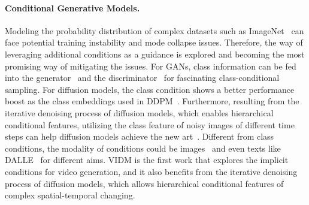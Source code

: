 \documentclass[letterpaper]{article}
\begin{document}
\paragraph{Conditional Generative Models.}
Modeling the probability distribution of complex datasets such as ImageNet~\cite{deng2009imagenet} can face potential training instability and mode collapse issues.
Therefore, the way of leveraging additional conditions as a guidance is explored and becoming the most promising way of mitigating the issues.
For GANs, class information can be fed into the generator~\cite{mirza2014conditional, odena2017conditional, de2017modulating, dumoulin2016learned, brock2018large} and the discriminator~\cite{miyato2018cgans,karras2019style} for fascinating class-conditional sampling.
For diffusion models, the class condition shows a better performance boost as the class embeddings used in DDPM~\cite{ho2020denoising}.
Furthermore, resulting from the iterative denoising process of diffusion models, which enables hierarchical conditional features, utilizing the class feature of noisy images of different time steps can help diffusion models achieve the new art~\cite{dhariwal2021diffusion}.
Different from class conditions, the modality of conditions could be images~\cite{ledig2017photo, nair2022ddpm} and even texts like DALLE~\cite{ramesh2021zero} for different aims.
VIDM is the first work that explores the implicit conditions for video generation, and it also benefits from the iterative denoising process of diffusion models, which allows hierarchical conditional features of complex spatial-temporal changing.
\end{document}
